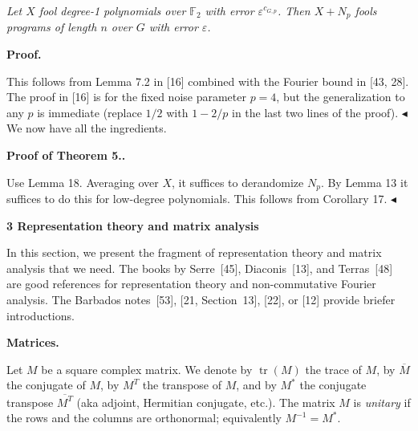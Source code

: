 \emph{Let $X$ fool degree-1 polynomials over $\mathbb{F}_{2}$
with error $\varepsilon^{c_{G,p}}$. Then $X+N_{p}$ fools programs of length $n$ over $G$
with error $\varepsilon$.}\par







\par\medskip\noindent\textbf{Proof.}\par




This follows from Lemma 7.2 in [16] combined
with the Fourier bound in [43, 28].
The proof in [16]
is for the fixed noise parameter $p=4$, but the generalization
to any $p$ is immediate (replace $1/2$ with $1-2/p$ in the last
two lines of the proof).
$\blacktriangleleft$
We now have all the ingredients.\par





\par\medskip\noindent\textbf{Proof of Theorem 5..}\par




Use Lemma 18. Averaging over $X$, it suffices to derandomize
$N_{p}$. By Lemma 13 it suffices to do this
for low-degree polynomials. This follows from Corollary 17.
$\blacktriangleleft$\par






\par\medskip\noindent\textbf{
3 Representation theory and matrix analysis}\par




In this section, we present the fragment of representation theory and matrix analysis that we need. The books by Serre [45], Diaconis [13], and Terras [48] are good references for representation theory and
non-commutative Fourier analysis. The Barbados notes [53], [21, Section 13], [22], or [12] provide briefer introductions.\par




\par\medskip\noindent\textbf{Matrices.}\par




Let $M$ be a square complex matrix. We denote by $\operatorname{tr}(M)$
the trace of $M$, by $\overline{M}$ the conjugate of $M$, by $M^{T}$
the transpose of $M$, and by $M^{*}$ the conjugate transpose $\overline{M^{T}}$
(aka adjoint, Hermitian conjugate, etc.). The matrix $M$ is \emph{unitary}
if the rows and the columns are orthonormal; equivalently $M^{-1}=M^{*}$.\par




